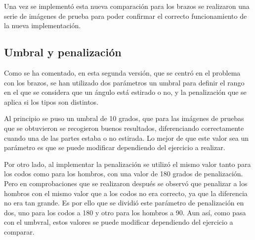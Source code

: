Una vez se implementó esta nueva comparación para los brazos se realizaron una serie de imágenes de prueba para poder confirmar el correcto funcionamiento de la nueva implementación.

\subsection{Umbral y penalización}
Como se ha comentado, en esta segunda versión, que se centró en el problema con los brazos, se han utilizado dos parámetros un umbral para definir el rango en el que se considera que un ángulo está estirado o no, y la penalización que se aplica si los tipos son distintos.

Al principio se puso un umbral de 10 grados, que para las imágenes de pruebas que se obtuvieron se recogieron buenos resultados, diferenciando correctamente cuando una de las partes estaba o no estirada. Lo mejor de que este valor sea un parámetro es que se puede modificar dependiendo del ejercicio a realizar.

Por otro lado, al implementar la penalización se utilizó el mismo valor tanto para los codos como para los hombros, con una valor de 180 grados de penalización. Pero en comprobaciones que se realizaron después se observó que penalizar a los hombros con el mismo valor que a los codos no era correcto, ya que la diferencia no era tan grande. Es por ello que se dividió este parámetro de penalización en dos, uno para los codos a 180 y otro para los hombros a 90. Aun así, como pasa con el umbvral, estos valores se puede modificar dependiendo del ejercicio a comparar.
